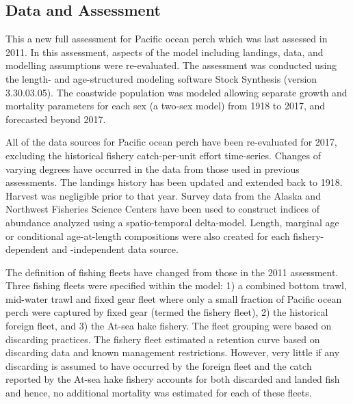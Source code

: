 \documentclass[12pt,]{article}
\begin{document}
\FloatBarrier

\subsection*{Data and Assessment}\label{data-and-assessment}

This a new full assessment for Pacific ocean perch which was last
assessed in 2011. In this assessment, aspects of the model including
landings, data, and modelling assumptions were re-evaluated. The
assessment was conducted using the length- and age-structured modeling
software Stock Synthesis (version 3.30.03.05). The coastwide population
was modeled allowing separate growth and mortality parameters for each
sex (a two-sex model) from 1918 to 2017, and forecasted beyond 2017.

All of the data sources for Pacific ocean perch have been re-evaluated
for 2017, excluding the historical fishery catch-per-unit effort
time-series. Changes of varying degrees have occurred in the data from
those used in previous assessments. The landings history has been
updated and extended back to 1918. Harvest was negligible prior to that
year. Survey data from the Alaska and Northwest Fisheries Science
Centers have been used to construct indices of abundance analyzed using
a spatio-temporal delta-model. Length, marginal age or conditional
age-at-length compositions were also created for each fishery-dependent
and -independent data source.

The definition of fishing fleets have changed from those in the 2011
assessment. Three fishing fleets were specified within the model: 1) a
combined bottom trawl, mid-water trawl and fixed gear fleet where only a
small fraction of Pacific ocean perch were captured by fixed gear
(termed the fishery fleet), 2) the historical foreign fleet, and 3) the
At-sea hake fishery. The fleet grouping were based on discarding
practices. The fishery fleet estimated a retention curve based on
discarding data and known management restrictions. However, very little
if any discarding is assumed to have occurred by the foreign fleet and
the catch reported by the At-sea hake fishery accounts for both
discarded and landed fish and hence, no additional mortality was
estimated for each of these fleets.
\end{document}
